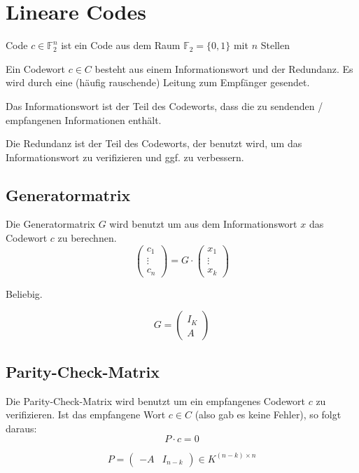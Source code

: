 \documentclass{scrartcl}
\begin{document}
\newpage
\section{Lineare Codes}

Code $c \in \mathbb{F}_2^n$ ist ein Code aus dem Raum $\mathbb{F}_2 = \{0,1\}$ mit $n$ Stellen

\begin{Def}[Codewort]
Ein Codewort $c \in C$ besteht aus einem Informationswort und der Redundanz. Es wird durch eine (häufig rauschende) Leitung zum Empfänger gesendet.
\end{Def}

\begin{Def}[Informationswort]
Das Informationswort ist der Teil des Codeworts, dass die zu sendenden / empfangenen Informationen enthält.
\end{Def}
\begin{Def}[Redundanz]
Die Redundanz ist der Teil des Codeworts, der benutzt wird, um das Informationswort zu verifizieren und ggf. zu verbessern.
\end{Def}

\subsection{Generatormatrix}
\begin{Def}
Die Generatormatrix $G$ wird benutzt um aus dem Informationswort $x$ das Codewort $c$ zu berechnen.
\[
\begin{pmatrix} c_1 \\ \vdots \\ c_n \end{pmatrix} = G \cdot \begin{pmatrix} x_1 \\ \vdots \\ x_k \end{pmatrix}
\]
\end{Def}
\begin{Def}
Beliebig.
\begin{Beispiel}
\[
G = \begin{pmatrix} I_K \\ A \end{pmatrix}
\]
\end{Beispiel}
\end{Def}

\subsection{Parity-Check-Matrix}
\begin{Def}
Die Parity-Check-Matrix wird benutzt um ein empfangenes Codewort $c$ zu verifizieren. Ist das empfangene Wort $c \in C$ (also gab es keine Fehler), so folgt daraus:
\[
P \cdot c = 0
\]
\end{Def}
\begin{Satz}
\[
P = \begin{pmatrix} -A & I_{n-k} \end{pmatrix} \in K^{(n-k) \times n}
\]
\end{Satz}
\end{document}
